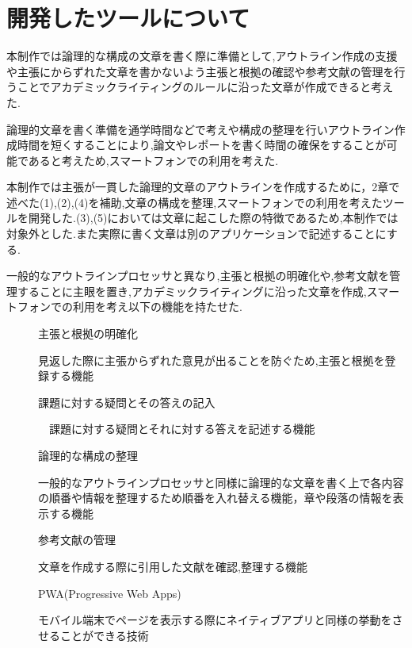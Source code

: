\documentclass[twocolumn,10pt,a4j]{jsarticle}
\begin{document}
\section{開発したツールについて}
本制作では論理的な構成の文章を書く際に準備として,アウトライン作成の支援や主張にからずれた文章を書かないよう主張と根拠の確認や参考文献の管理を行うことでアカデミックライティングのルールに沿った文章が作成できると考えた.

論理的文章を書く準備を通学時間などで考えや構成の整理を行いアウトライン作成時間を短くすることにより,論文やレポートを書く時間の確保をすることが可能であると考えため,スマートフォンでの利用を考えた.

本制作では主張が一貫した論理的文章のアウトラインを作成するために，2章で述べた(1),(2),(4)を補助,文章の構成を整理,スマートフォンでの利用を考えたツールを開発した.(3),(5)においては文章に起こした際の特徴であるため,本制作では対象外とした.また実際に書く文章は別のアプリケーションで記述することにする.

一般的なアウトラインプロセッサと異なり,主張と根拠の明確化や,参考文献を管理することに主眼を置き,アカデミックライティングに沿った文章を作成,スマートフォンでの利用を考え以下の機能を持たせた.

\begin{description}
  \item[]主張と根拠の明確化
  
  見返した際に主張からずれた意見が出ることを防ぐため,主張と根拠を登録する機能
  
  \item[]課題に対する疑問とその答えの記入
  
　課題に対する疑問とそれに対する答えを記述する機能
  
  \item[]論理的な構成の整理
  
  一般的なアウトラインプロセッサと同様に論理的な文章を書く上で各内容の順番や情報を整理するため順番を入れ替える機能，章や段落の情報を表示する機能
  
  \item[]参考文献の管理
  
  文章を作成する際に引用した文献を確認,整理する機能 
  
  \item[]PWA(Progressive Web Apps)
  
  モバイル端末でページを表示する際にネイティブアプリと同様の挙動をさせることができる技術
\end{description}
\end{document}
